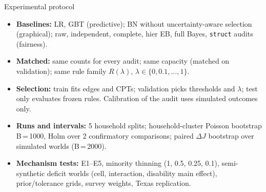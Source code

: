 \documentclass[aspectratio=169,11pt]{beamer}
\begin{document}
\begin{frame}{Experimental protocol}
\begin{itemize}
\item \textbf{Baselines:} LR, GBT (predictive); BN without uncertainty-aware selection (graphical); raw, independent,
  complete, hier EB, full Bayes, \texttt{struct} audits (fairness).
\item \textbf{Matched:} same counts for every audit; same capacity (matched on validation); same rule family $R(\lambda)$,
  $\lambda\in\{0,0.1,\dots,1\}$.
\item \textbf{Selection:} train fits edges and CPTs; validation picks thresholds and $\lambda$; test only evaluates frozen rules.
  Calibration of the audit uses simulated outcomes only.
\item \textbf{Runs and intervals:} 5 household splits; household-cluster Poisson bootstrap B\,=\,1000, Holm over 2
  confirmatory comparisons; paired $\Delta J$ bootstrap over simulated worlds (B\,=\,2000).
\item \textbf{Mechanism tests:} E1--E5, minority thinning (1, 0.5, 0.25, 0.1), semi-synthetic deficit worlds (cell,
  interaction, disability main effect), prior/tolerance grids, survey weights, Texas replication.
\end{itemize}
\end{frame}
\end{document}
